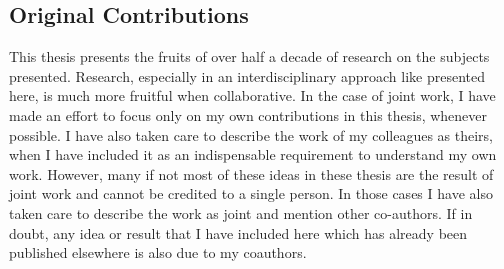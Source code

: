 \subsection*{Original Contributions}
This thesis presents the fruits of over half a decade of research on the subjects presented.
Research, especially in an interdisciplinary approach like presented here, is much more fruitful when collaborative.
In the case of joint work, I have made an effort to focus only on my own contributions in this thesis, whenever possible.
I have also taken care to describe the work of my colleagues as theirs, when I have included it as an indispensable requirement to understand my own work.
However,  many if not most of these ideas in these thesis are the result of joint work and cannot be credited to a single person.
In those cases I have also taken care to describe the work as joint and mention other co-authors.
If in doubt, any idea or result that I have included here which has already been published elsewhere is also due to my coauthors.

%


